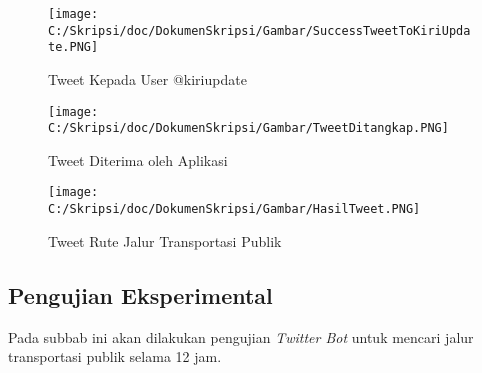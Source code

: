 \begin{figure}[htbp]
	\centering
		\texttt{[image: C:/Skripsi/doc/DokumenSkripsi/Gambar/SuccessTweetToKiriUpdate.PNG]}
	\caption{Tweet Kepada User @kiriupdate}
	\label{fig:SuccessTweetToKiriUpdate}
\end{figure}

\begin{figure}[htbp]
	\centering
		\texttt{[image: C:/Skripsi/doc/DokumenSkripsi/Gambar/TweetDitangkap.PNG]}
	\caption{Tweet Diterima oleh Aplikasi}
	\label{fig:TweetDitangkap}
\end{figure}

\begin{figure}[htbp]
	\centering
		\texttt{[image: C:/Skripsi/doc/DokumenSkripsi/Gambar/HasilTweet.PNG]}
	\caption{Tweet Rute Jalur Transportasi Publik}
	\label{fig:HasilTweet}
\end{figure}

\subsection{Pengujian Eksperimental}
Pada subbab ini akan dilakukan pengujian \textit{Twitter Bot} untuk mencari jalur transportasi publik selama 12 jam.